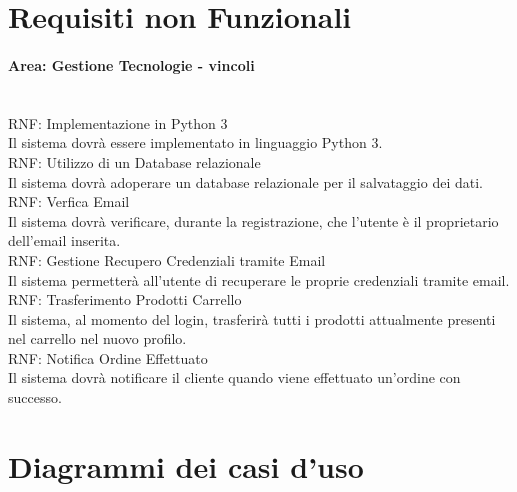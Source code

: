 \setcounter{contrequisiti}{1}
\section{Requisiti non Funzionali}
\label{sec:RequisitiNonFunzionali}

\paragraph{Area: Gestione Tecnologie - vincoli}\mbox{}\\
RNF\thecontrequisiti: Implementazione in Python 3\\
Il sistema dovrà essere implementato in linguaggio Python 3.\vspace{10px} \\ 
RNF\thecontrequisiti: Utilizzo di un Database relazionale\\
Il sistema dovrà adoperare un database relazionale per il salvataggio dei dati.\vspace{10px} \\ 
RNF\thecontrequisiti: Verfica Email\\
Il sistema dovrà verificare, durante la registrazione, che l'utente è il proprietario dell'email inserita.\vspace{10px} \\ 
RNF\thecontrequisiti: Gestione Recupero Credenziali tramite Email\\
Il sistema permetterà all'utente di recuperare le proprie credenziali tramite email.\vspace{10px} \\ 
RNF\thecontrequisiti: Trasferimento Prodotti Carrello\\
Il sistema, al momento del login, trasferirà tutti i prodotti attualmente presenti nel carrello nel nuovo profilo.\vspace{10px} \\ 
RNF\thecontrequisiti: Notifica Ordine Effettuato\\
Il sistema dovrà notificare il cliente quando viene effettuato un'ordine con successo.\vspace{10px} \\ 


\newpage\section{Diagrammi dei casi d'uso}
\label{sec:DiagrammiDeiCasiDuso}

